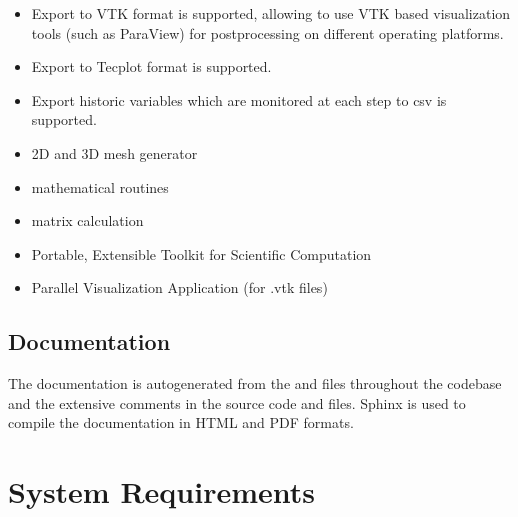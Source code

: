 \documentclass[letterpaper,10pt,english]{sphinxmanual}
\begin{document}
\begin{itemize}
\item {} 
Export to VTK format is supported, allowing to use VTK based visualization tools (such as ParaView) for postprocessing on different operating platforms.

\item {} 
Export to Tecplot format is supported.

\item {} 
Export historic variables which are monitored at each step to csv is supported.

\end{itemize}

\begin{itemize}
\item {} 
 \sphinxhyphen{} 2D and 3D mesh generator

\item {} 
 \sphinxhyphen{} mathematical routines

\item {} 
 \sphinxhyphen{} matrix calculation

\item {} 
 \sphinxhyphen{} Portable, Extensible Toolkit for Scientific Computation

\item {} 
 \sphinxhyphen{} Parallel Visualization Application (for .vtk files)

\end{itemize}


\section{Documentation}
\label{\detokenize{rst_about_project/intro:documentation}}
The documentation is auto\sphinxhyphen{}generated from the  and  files throughout
the codebase and the extensive comments in the source code  and  files. Sphinx is used to compile
the documentation in HTML and PDF formats.


\chapter{System Requirements}
\label{\detokenize{rst_about_project/requirements:system-requirements}}\label{\detokenize{rst_about_project/requirements::doc}}
\end{document}
